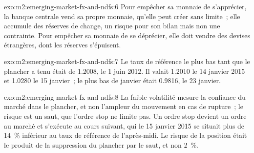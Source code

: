 \begin{solution}{exo:m2:emerging-market-fx-and-ndfs:6}
Pour empêcher sa monnaie de s'apprécier, la banque centrale vend sa propre monnaie,
qu'elle peut créer sans limite~; elle accumule des réserves de change, un risque pour son bilan
mais non une contrainte. Pour empêcher sa monnaie de se déprécier, elle doit vendre des devises étrangères,
dont les réserves s'épuisent.
\end{solution}

\begin{solution}{exo:m2:emerging-market-fx-and-ndfs:7}
Le taux de référence le plus bas tant que le plancher a tenu était de 1.2008, le 1 juin 2012. Il
valait 1.2010 le 14 janvier 2015 et 1.0280 le 15 janvier~; le plus bas de janvier était
0.9816, le 23 janvier.
\end{solution}

\begin{solution}{exo:m2:emerging-market-fx-and-ndfs:8}
La faible volatilité mesure la confiance du marché dans le plancher, et non l'ampleur
du mouvement en cas de rupture~; le risque est un saut, que l'ordre stop ne limite pas. Un ordre stop
devient un ordre au marché et s'exécute au cours suivant, qui le 15 janvier 2015 se situait
plus de 14~\% inférieur au taux de référence de l'après-midi. Le risque de la position était
le produit de la suppression du plancher par le saut, et non 2~\%.
\end{solution}

